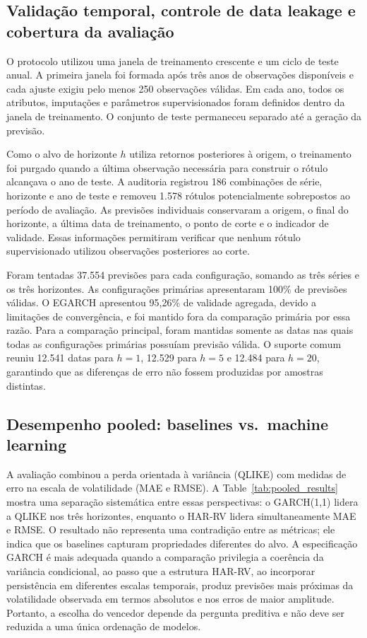 \documentclass[a4paper,fleqn]{cas-sc}
\begin{document}
\subsection{Validação temporal, controle de data leakage e cobertura da avaliação}
\label{subsec:experimental_validation}

O protocolo utilizou uma janela de treinamento crescente e um ciclo de teste anual. A primeira janela foi formada após três anos de observações disponíveis e cada ajuste exigiu pelo menos 250 observações válidas. Em cada ano, todos os atributos, imputações e parâmetros supervisionados foram definidos dentro da janela de treinamento. O conjunto de teste permaneceu separado até a geração da previsão.

Como o alvo de horizonte \(h\) utiliza retornos posteriores à origem, o treinamento foi purgado quando a última observação necessária para construir o rótulo alcançava o ano de teste. A auditoria registrou 186 combinações de série, horizonte e ano de teste e removeu 1.578 rótulos potencialmente sobrepostos ao período de avaliação. As previsões individuais conservaram a origem, o final do horizonte, a última data de treinamento, o ponto de corte e o indicador de validade. Essas informações permitiram verificar que nenhum rótulo supervisionado utilizou observações posteriores ao corte.

Foram tentadas 37.554 previsões para cada configuração, somando as três séries e os três horizontes. As configurações primárias apresentaram 100\% de previsões válidas. O EGARCH apresentou 95,26\% de validade agregada, devido a limitações de convergência, e foi mantido fora da comparação primária por essa razão. Para a comparação principal, foram mantidas somente as datas nas quais todas as configurações primárias possuíam previsão válida. O suporte comum reuniu 12.541 datas para \(h=1\), 12.529 para \(h=5\) e 12.484 para \(h=20\), garantindo que as diferenças de erro não fossem produzidas por amostras distintas.

\subsection{Desempenho pooled: baselines vs.\ machine learning}
\label{subsec:results_coverage}

A avaliação combinou a perda orientada à variância (QLIKE) com medidas de erro na escala de volatilidade (MAE e RMSE). A Table~\ref{tab:pooled_results} mostra uma separação sistemática entre essas perspectivas: o GARCH(1,1) lidera a QLIKE nos três horizontes, enquanto o HAR-RV lidera simultaneamente MAE e RMSE. O resultado não representa uma contradição entre as métricas; ele indica que os baselines capturam propriedades diferentes do alvo. A especificação GARCH é mais adequada quando a comparação privilegia a coerência da variância condicional, ao passo que a estrutura HAR-RV, ao incorporar persistência em diferentes escalas temporais, produz previsões mais próximas da volatilidade observada em termos absolutos e nos erros de maior amplitude. Portanto, a escolha do vencedor depende da pergunta preditiva e não deve ser reduzida a uma única ordenação de modelos.
\end{document}
